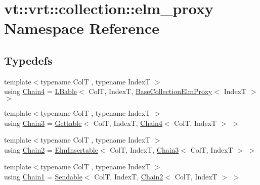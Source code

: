 \hypertarget{namespacevt_1_1vrt_1_1collection_1_1elm__proxy}{}\section{vt\+:\+:vrt\+:\+:collection\+:\+:elm\+\_\+proxy Namespace Reference}
\label{namespacevt_1_1vrt_1_1collection_1_1elm__proxy}
\subsection*{Typedefs}
\begin{DoxyCompactItemize}
\item 
{\footnotesize template$<$typename ColT , typename IndexT $>$ }\\using \hyperlink{namespacevt_1_1vrt_1_1collection_1_1elm__proxy_af0c90ff3494dd7649dfce8048ab2240f}{Chain4} = \hyperlink{structvt_1_1vrt_1_1collection_1_1_l_bable}{L\+Bable}$<$ ColT, IndexT, \hyperlink{structvt_1_1vrt_1_1collection_1_1_base_collection_elm_proxy}{Base\+Collection\+Elm\+Proxy}$<$ IndexT $>$ $>$
\item 
{\footnotesize template$<$typename ColT , typename IndexT $>$ }\\using \hyperlink{namespacevt_1_1vrt_1_1collection_1_1elm__proxy_a8db2caa0e0d4bb8dafc382c8953b2574}{Chain3} = \hyperlink{structvt_1_1vrt_1_1collection_1_1_gettable}{Gettable}$<$ ColT, IndexT, \hyperlink{namespacevt_1_1vrt_1_1collection_1_1elm__proxy_af0c90ff3494dd7649dfce8048ab2240f}{Chain4}$<$ ColT, IndexT $>$ $>$
\item 
{\footnotesize template$<$typename ColT , typename IndexT $>$ }\\using \hyperlink{namespacevt_1_1vrt_1_1collection_1_1elm__proxy_ad78450181b0704fe0969ae1d0f6cb4c7}{Chain2} = \hyperlink{structvt_1_1vrt_1_1collection_1_1_elm_insertable}{Elm\+Insertable}$<$ ColT, IndexT, \hyperlink{namespacevt_1_1vrt_1_1collection_1_1elm__proxy_a8db2caa0e0d4bb8dafc382c8953b2574}{Chain3}$<$ ColT, IndexT $>$ $>$
\item 
{\footnotesize template$<$typename ColT , typename IndexT $>$ }\\using \hyperlink{namespacevt_1_1vrt_1_1collection_1_1elm__proxy_af1c695e3f939aca249111179a57b24bf}{Chain1} = \hyperlink{structvt_1_1vrt_1_1collection_1_1_sendable}{Sendable}$<$ ColT, IndexT, \hyperlink{namespacevt_1_1vrt_1_1collection_1_1elm__proxy_ad78450181b0704fe0969ae1d0f6cb4c7}{Chain2}$<$ ColT, IndexT $>$ $>$
\end{DoxyCompactItemize}


